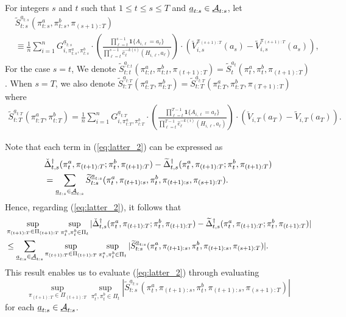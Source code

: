 For integers $s$ and $t$ such that $1 \leq t \leq s \leq T$ and $\underline{a}_{t:s} \in \underline{\mathcal{A}}_{t:s}$, let
\begin{align*}
    &\widetilde{S}_{t:s}^{\underline{a}_{t:s}}(\pi_{t:s}^{a},\pi_{t:s}^{b},\pi_{(s+1):T}) \\
    &\equiv  \frac{1}{n}\sum_{i=1}^{n} G_{i,\pi_{t:s}^{a},\pi_{t:s}^{b}}^{\underline{a}_{t:s}}\cdot \left(\frac{\prod_{\ell = t}^{s-1}\mathbf{1}\{ A_{i,\ell} = a_{\ell}\} }{\prod_{\ell = t}^{s-1}\hat{e}_{\ell}^{-k(i)}(H_{i,\ell},a_{\ell}) } \right) 
    \cdot \left(\check{V}_{i,s}^{\pi_{(s+1):T}}(a_s) - \widetilde{V}_{i,s}^{\pi_{(s+1):T}}(a_s)\right),
\end{align*}
For the case $s=t$, We denote $ \widetilde{S}_{t:t}^{\underline{a}_{t:t}}(\pi_{t:t}^{a},\pi_{t:t}^{b},\pi_{(t+1):T}) = \widetilde{S}_{t}^{a_{t}}(\pi_{t}^{a},\pi_{t}^{b},\pi_{(t+1):T})$.
When $s=T$, we also denote $\widetilde{S}_{t:T}^{\underline{a}_{t:T}}(\pi_{t:T}^{a},\pi_{t:T}^{b}) = \widetilde{S}_{t:T}^{\underline{a}_{t:T}}(\pi_{t:T}^{a},\pi_{t:T}^{b},\pi_{(T+1):T})$ where
\begin{align*}
    \widetilde{S}_{t:T}^{\underline{a}_{t:T}}(\pi_{t:T}^{a},\pi_{t:T}^{b}) = \frac{1}{n}\sum_{i=1}^{n} G_{i,\pi_{t:T}^{a},\pi_{t:T}^{b}}^{\underline{a}_{t:T}}\cdot \left(\frac{\prod_{\ell = t}^{T-1}\mathbf{1}\{ A_{i,\ell} = a_{\ell}\} }{\prod_{\ell = t}^{T-1}\hat{e}_{\ell}^{-k(i)}(H_{i,\ell},a_{\ell}) } \right) 
    \cdot \left(\check{V}_{i,T}(a_T) - \widetilde{V}_{i,T}(a_T)\right).
\end{align*}

Note that each term in (\ref{eq:latter_2}) can be expressed as
\begin{align*}
    &\check{\Delta}_{t,s}^{\dagger}(\pi_{t}^{a},\pi_{(t+1):T};\pi_{t}^{b},\pi_{(t+1):T}) - \widetilde{\Delta}_{t,s}^{\dagger}(\pi_{t}^{a},\pi_{(t+1):T};\pi_{t}^{b},\pi_{(t+1):T})\\
    &=\sum_{\underline{a}_{t:s} \in \underline{\mathcal{A}}_{t:s}} \widetilde{S}_{t:s}^{\underline{a}_{t:s}}(\pi_{t}^{a},\pi_{(t+1):s},\pi_{t}^{b},\pi_{(t+1):s},\pi_{(s+1):T}). 
\end{align*}
Hence, regarding (\ref{eq:latter_2}), it follows that
\begin{align}
     &\sup_{\pi_{(t+1):T} \in \Pi_{(t+1):T}} \sup_{\pi_{t}^{a},\pi_{t}^{b} \in \Pi_{t}} |\check{\Delta}_{t,s}^{\dagger}(\pi_{t}^{a},\pi_{(t+1):T};\pi_{t}^{b},\pi_{(t+1):T}) - \widetilde{\Delta}_{t,s}^{\dagger}(\pi_{t}^{a},\pi_{(t+1):T};\pi_{t}^{b},\pi_{(t+1):T})| \nonumber \\
     &\leq \sum_{\underline{a}_{t:s} \in \underline{\mathcal{A}}_{t:s}} \sup_{\pi_{(t+1):T} \in \Pi_{(t+1):T}} \sup_{\pi_{t}^{a},\pi_{t}^{b} \in \Pi_{t}} |\widetilde{S}_{t:s}^{\underline{a}_{t:s}}(\pi_{t}^{a},\pi_{(t+1):s},\pi_{t}^{b},\pi_{(t+1):s},\pi_{(s+1):T})|. \label{eq:latter_2_bound}
\end{align}
This result enables us to evaluate (\ref{eq:latter_2}) through evaluating $$\sup_{\pi_{(t+1):T} \in \Pi_{(t+1):T}} \sup_{\pi_{t}^{a},\pi_{t}^{b} \in \Pi_{t}} |\widetilde{S}_{t:s}^{\underline{a}_{t:s}}(\pi_{t}^{a},\pi_{(t+1):s},\pi_{t}^{b},\pi_{(t+1):s},\pi_{(s+1):T})|$$
for each $\underline{a}_{t:s} \in \underline{\mathcal{A}}_{t:s}$.

